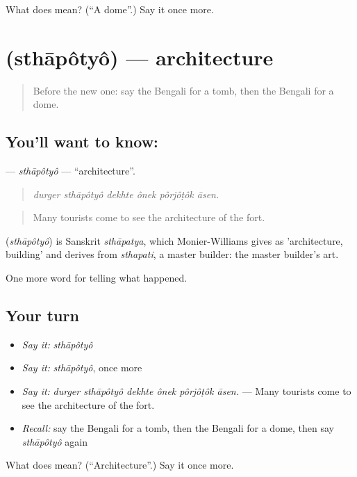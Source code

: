 \begin{tcolorbox}[breakable,colback=teal!4,colframe=teal!35!black,title={Before you move on}]
What does  mean? (\textquotedblleft{}A dome\textquotedblright{}.) Say it once more.
\end{tcolorbox}
\section[\texorpdfstring{\bn{স্থাপত্য} (sthāpôtyô)}{স্থাপত্য (sthāpôtyô)}]{ (sthāpôtyô) — architecture}

\label{lesson:BN-C320-sthapotyo}



\begin{quote}
Before the new one: say the Bengali for a tomb, then the Bengali for a dome.
\end{quote}

\subsection*{You'll want to know: }
\textbf{} — \emph{sthāpôtyô} — \textquotedblleft{}architecture\textquotedblright{}.

\begin{quote}
     
\end{quote}

\begin{quote}
\emph{durger sthāpôtyô dekhte ônek pôrjôṭôk āsen.}
\end{quote}

\begin{quote}
Many tourists come to see the architecture of the fort.
\end{quote}

\begin{cousinweb}
\textbf{} (\emph{sthāpôtyô}) is Sanskrit \emph{sthāpatya}, which Monier-Williams gives as 'architecture, building' and derives from \emph{sthapati}, a master builder: the master builder's art.
\end{cousinweb}

\begin{grammarlens}[title={What you've built}]
One more word for telling what happened.
\end{grammarlens}

\subsection*{Your turn}
\begin{itemize}
\raggedright
  \item \emph{Say it:} \emph{sthāpôtyô}
  \item \emph{Say it:} \emph{sthāpôtyô}, once more
  \item \emph{Say it:} \emph{durger sthāpôtyô dekhte ônek pôrjôṭôk āsen.} — Many tourists come to see the architecture of the fort.
  \item \emph{Recall:} say the Bengali for a tomb, then the Bengali for a dome, then say \emph{sthāpôtyô} again
\end{itemize}

\begin{tcolorbox}[breakable,colback=teal!4,colframe=teal!35!black,title={Before you move on}]
What does  mean? (\textquotedblleft{}Architecture\textquotedblright{}.) Say it once more.
\end{tcolorbox}
